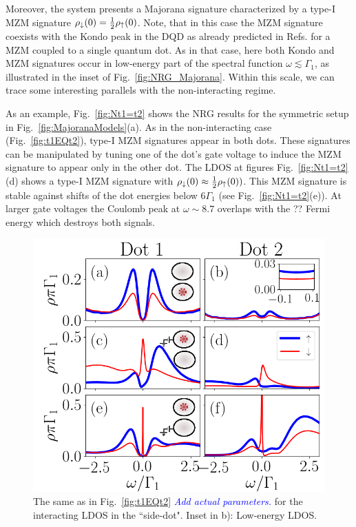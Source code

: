 \documentclass[showpacs,aps,prb,reprint,superscriptaddress]{revtex4-1}
\newcommand{\LUIS}[1]{\textcolor{blue}{\fbox{Luis} {\sl#1}}}
\begin{document}
Moreover, the system presents a Majorana signature characterized by a type-I MZM signature $\rho_\downarrow(0) = \frac{1}{2}\rho_\uparrow(0)$. Note, that in this case the MZM signature coexists with the Kondo peak in the DQD as already predicted in Refs. \cite{lee_kondo_2013,ruiz-tijerina_interaction_2015} for a MZM coupled to a single quantum dot. As in that case, here both Kondo and MZM signatures occur in low-energy part of the spectral function $\omega \lesssim \Gamma_1$, as illustrated in the inset of Fig.\ \ref{fig:NRG_Majorana}. Within this scale, we can trace some interesting parallels with the non-interacting regime. 

As an example, Fig.\ \ref{fig:Nt1=t2} shows the NRG results for the symmetric setup in Fig.\ \ref{fig:MajoranaModels}(a). As in the non-interacting case (Fig.\ \ref{fig:t1EQt2}), type-I MZM  signatures appear in both dots.  These signatures can be manipulated by tuning one of the dot's gate voltage to induce the MZM signature to appear only in the other dot. The LDOS at figures Fig.\ \ref{fig:Nt1=t2}(d) shows a type-I MZM  signature with $\rho_\downarrow(0) \approx \frac{1}{2}\rho_\uparrow(0))$. This MZM signature is stable against shifts of the dot energies below $6\Gamma_1$ (see Fig.\ \ref{fig:Nt1=t2}(e)). At larger gate voltages the Coulomb peak at $\omega \sim 8.7$ overlaps with the ?? Fermi energy which destroys both signals.

  



\begin{figure}[bt]
\begin{center}
\includegraphics[scale=0.45]{Graficos/b_Nt1gt0.png}
\caption{  \label{fig:Nt1>0} The same as in Fig.\ \ref{fig:t1EQt2} \LUIS{Add actual parameters.} for the  interacting LDOS in the ``side-dot". Inset in b): Low-energy LDOS.  
}
%
\end{center}
\end{figure}
\end{document}
